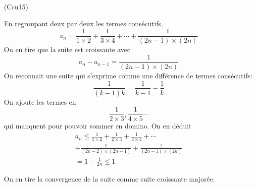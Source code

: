 \begin{tiny}(Ccu15)\end{tiny} En regroupant deux par deux les termes consécutifs,
\begin{displaymath}
  a_n = \frac{1}{1\times 2} + \frac{1}{3\times 4} +\cdots + \frac{1}{(2n-1)\times (2n)}
\end{displaymath}
On en tire que la suite est croissante avec
\begin{displaymath}
  a_n - a_{n-1} = \frac{1}{(2n-1)\times (2n)}
\end{displaymath}
On reconnait une suite qui s'exprime comme une différence de termes consécutifs:
\begin{displaymath}
  \frac{1}{(k-1)k} = \frac{1}{k-1} - \frac{1}{k}
\end{displaymath}
On ajoute les termes en 
\begin{displaymath}
\frac{1}{2\times 3}, \frac{1}{4\times 5} \cdots  
\end{displaymath}
qui manquent pour pouvoir sommer en domino. On en déduit
\begin{multline*}
  a_n \leq \frac{1}{1\times 2} + \frac{1}{2\times 3}+ \frac{1}{3\times 4} +\cdots \\
  + \frac{1}{(2n-2)\times (2n-1)}+ \frac{1}{(2n-1)\times (2n)}\\
  = 1 - \frac{1}{2n} \leq 1
\end{multline*}

On en tire la convergence de la suite comme suite croissante majorée.
